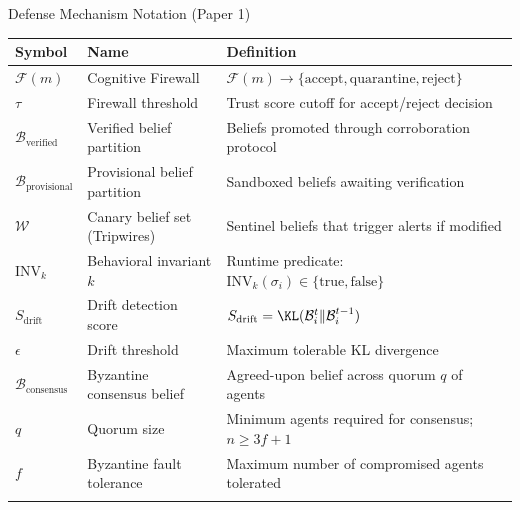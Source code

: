 \documentclass[
  ignorenonframetext,
]{beamer}
\newcounter{none} %
\begin{document}
\begin{frame}[allowframebreaks]{Defense Mechanism Notation (Paper 1)}
\protect{}\label{defense-mechanism-notation-paper-1}
{\def\LTcaptype{none} %
\begin{longtable}[]{@{}
  >{\raggedright\arraybackslash}p{}
  >{\raggedright\arraybackslash}p{}
  >{\raggedright\arraybackslash}p{}@{}}
\toprule\noalign{}
\begin{minipage}[b]{\linewidth}\raggedright
Symbol
\end{minipage} & \begin{minipage}[b]{\linewidth}\raggedright
Name
\end{minipage} & \begin{minipage}[b]{\linewidth}\raggedright
Definition
\end{minipage} \\
\midrule\noalign{}
\endhead
\(\mathcal{F}(m)\) & Cognitive Firewall &
\(\mathcal{F}(m) \to \{\text{accept}, \text{quarantine}, \text{reject}\}\) \\
\(\tau\) & Firewall threshold & Trust score cutoff for accept/reject
decision \\
\(\mathcal{B}_{\text{verified}}\) & Verified belief partition & Beliefs
promoted through corroboration protocol \\
\(\mathcal{B}_{\text{provisional}}\) & Provisional belief partition &
Sandboxed beliefs awaiting verification \\
\(\mathcal{W}\) & Canary belief set (Tripwires) & Sentinel beliefs that
trigger alerts if modified \\
\(\text{INV}_k\) & Behavioral invariant \(k\) & Runtime predicate:
\(\text{INV}_k(\sigma_i) \in \{\text{true}, \text{false}\}\) \\
\(S_{\text{drift}}\) & Drift detection score &
\(S_{\text{drift}} = \KL(\mathcal{B}_i^t \| \mathcal{B}_i^{t-1})\) \\
\(\epsilon\) & Drift threshold & Maximum tolerable KL divergence \\
\(\mathcal{B}_{\text{consensus}}\) & Byzantine consensus belief &
Agreed-upon belief across quorum \(q\) of agents \\
\(q\) & Quorum size & Minimum agents required for consensus;
\(n \geq 3f+1\) \\
\(f\) & Byzantine fault tolerance & Maximum number of compromised agents
tolerated \\
\bottomrule\noalign{}
\end{longtable}
}
\end{frame}
\end{document}
